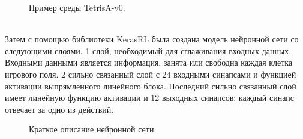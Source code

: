 \documentclass[draft]{article}
\begin{document}
\begin{figure}[h]
\caption{Пример среды TetrisA-v0.}
\label{ris:image}
\end{figure}\\
Затем с помощью библиотеки KerasRL была создана модель нейронной сети со следующими слоями. 1 слой, необходимый для сглаживания входных данных. Входными данными является информация, занята или свободна каждая клетка игрового поля. 2 сильно связанный слой с 24 входными синапсами и функцией активации выпрямленного линейного блока. Последний сильно связанный слой имеет линейную функцию активации и 12 выходных синапсов: каждый синапс отвечает за одно из действий.\\
\begin{figure}[h]
\caption{Краткое описание нейронной сети.}
\label{ris:image}
\end{figure}\\
\end{document}
